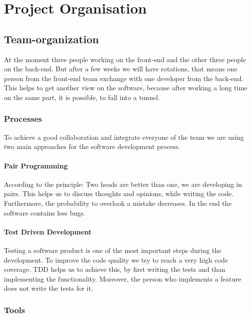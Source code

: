 \section{Project Organisation}

\subsection{Team-organization}

At the moment three people working on the front-end and the other three people on the back-end. But after a few weeks we will have rotations, that means one person from the front-end team exchange with one developer from the back-end. This helps to get another view on the software, because after working a long time on the same part, it is possible, to fall into a \grqq{}tunnel\grqq{}.

\subsubsection{Processes}

To achieve a good collaboration and integrate everyone of the team we are using two main approaches for the software development process.

\paragraph{Pair Programming}

According to the principle: Two heads are better than one, we are developing in pairs. This helps us to discuss thoughts and opinions, while writing the code. Furthermore, the probability to overlook a mistake decreases. In the end the software contains less bugs.

\paragraph{Test Driven Development}

Testing a software product is one of the most important steps during the development. To improve the code quality we try to reach a very high code coverage. TDD helps us to achieve this, by first writing the tests and than implementing the functionality. Moreover, the person who implements a feature does not write the tests for it. 

\subsubsection{Tools}

